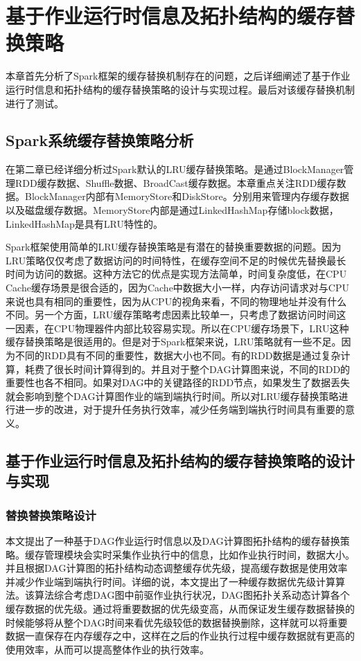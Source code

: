 \chapter{基于作业运行时信息及拓扑结构的缓存替换策略}\label{chap:guide}

本章首先分析了Spark框架的缓存替换机制存在的问题，之后详细阐述了基于作业运行时信息和拓扑结构的缓存替换策略的设计与实现过程。最后对该缓存替换机制进行了测试。

\section{Spark系统缓存替换策略分析}

在第二章已经详细分析过Spark默认的LRU缓存替换策略。是通过BlockManager管理RDD缓存数据、Shuffle数据、BroadCast缓存数据。本章重点关注RDD缓存数据。BlockManager内部有MemoryStore和DiskStore。分别用来管理内存缓存数据以及磁盘缓存数据。MemoryStore内部是通过LinkedHashMap存储block数据，LinkedHashMap是具有LRU特性的。

Spark框架使用简单的LRU缓存替换策略是有潜在的替换重要数据的问题。因为LRU策略仅仅考虑了数据访问的时间特性，在缓存空间不足的时候优先替换最长时间为访问的数据。这种方法它的优点是实现方法简单，时间复杂度低，在CPU Cache缓存场景是很合适的，因为Cache中数据大小一样，内存访问请求对与CPU来说也具有相同的重要性，因为从CPU的视角来看，不同的物理地址并没有什么不同。另一个方面，LRU缓存策略考虑因素比较单一，只考虑了数据访问时间这一因素，在CPU物理器件内部比较容易实现。所以在CPU缓存场景下，LRU这种缓存替换策略是很适用的。但是对于Spark框架来说，LRU策略就有一些不足。因为不同的RDD具有不同的重要性，数据大小也不同。有的RDD数据是通过复杂计算，耗费了很长时间计算得到的。并且对于整个DAG计算图来说，不同的RDD的重要性也各不相同。如果对DAG中的关键路径的RDD节点，如果发生了数据丢失就会影响到整个DAG计算图作业的端到端执行时间。所以对LRU缓存替换策略进行进一步的改进，对于提升任务执行效率，减少任务端到端执行时间具有重要的意义。

\section{基于作业运行时信息及拓扑结构的缓存替换策略的设计与实现}

\subsection{替换替换策略设计}

本文提出了一种基于DAG作业运行时信息以及DAG计算图拓扑结构的缓存替换策略。缓存管理模块会实时采集作业执行中的信息，比如作业执行时间，数据大小。并且根据DAG计算图的拓扑结构动态调整缓存优先级，提高缓存数据是使用效率并减少作业端到端执行时间。详细的说，本文提出了一种缓存数据优先级计算算法。该算法综合考虑DAG图中前驱作业执行状况，DAG图拓扑关系动态计算各个缓存数据的优先级。通过将重要数据的优先级变高，从而保证发生缓存数据替换的时候能够将从整个DAG时间来看优先级较低的数据替换删除，这样就可以将重要数据一直保存在内存缓存之中，这样在之后的作业执行过程中缓存数据就有更高的使用效率，从而可以提高整体作业的执行效率。

